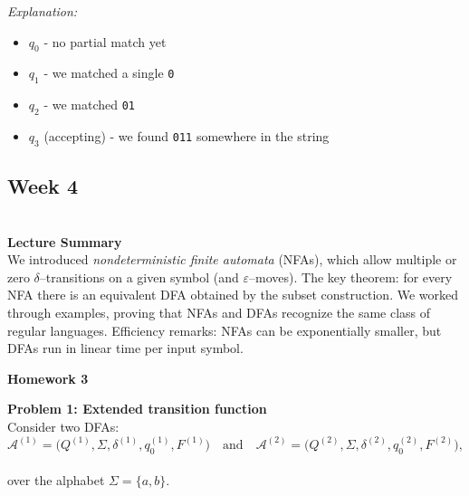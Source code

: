 \documentclass{article}
\theoremstyle{theorem}
\theoremstyle{definition}
\theoremstyle{remark}
\begin{document}
\noindent
\textit{Explanation:}
\begin{itemize}
\item $q_0$ - no partial match yet
\item $q_1$ - we matched a single \texttt{0}
\item $q_2$ - we matched \texttt{01}
\item $q_3$ (accepting) - we found \texttt{011} somewhere in the string
\end{itemize}
\bigskip



\subsection{Week 4}\\
\textbf{Lecture Summary}\\
We introduced \emph{nondeterministic finite automata} (NFAs), which allow multiple or zero $\delta$–transitions on a given symbol (and $\varepsilon$–moves).  The key theorem: for every NFA there is an equivalent DFA obtained by the subset construction.  We worked through examples, proving that NFAs and DFAs recognize the same class of regular languages.  Efficiency remarks: NFAs can be exponentially smaller, but DFAs run in linear time per input symbol.

\textbf{Homework 3}

\textbf{Problem 1: Extended transition function}\\
Consider two DFAs:
\[
\mathcal{A}^{(1)} = \big(Q^{(1)}, \Sigma, \delta^{(1)}, q_0^{(1)}, F^{(1)}\big) \quad \text{and} \quad \mathcal{A}^{(2)} = \big(Q^{(2)}, \Sigma, \delta^{(2)}, q_0^{(2)}, F^{(2)}\big),
\] 
\\over the alphabet $\Sigma = \{a, b\}$.
\begin{center}
\end{center}
\end{document}
